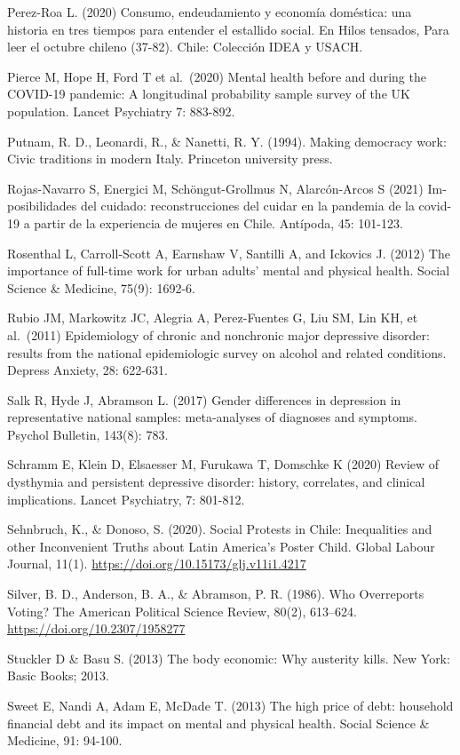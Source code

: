 \documentclass[
  12pt,
]{book}
\begin{document}
Perez-Roa L. (2020) Consumo, endeudamiento y economía doméstica: una historia en tres tiempos para entender el estallido social. En Hilos tensados, Para leer el octubre chileno (37-82). Chile: Colección IDEA y USACH.

Pierce M, Hope H, Ford T et al.~(2020) Mental health before and during the COVID-19 pandemic: A longitudinal probability sample survey of the UK population. Lancet Psychiatry 7: 883-892.

Putnam, R. D., Leonardi, R., \& Nanetti, R. Y. (1994). Making democracy work: Civic traditions in modern Italy. Princeton university press.

Rojas-Navarro S, Energici M, Schöngut-Grollmus N, Alarcón-Arcos S (2021) Im-posibilidades del cuidado: reconstrucciones del cuidar en la pandemia de la covid-19 a partir de la experiencia de mujeres en Chile. Antípoda, 45: 101-123.

Rosenthal L, Carroll-Scott A, Earnshaw V, Santilli A, and Ickovics J. (2012) The importance of full-time work for urban adults' mental and physical health. Social Science \& Medicine, 75(9): 1692-6.

Rubio JM, Markowitz JC, Alegria A, Perez-Fuentes G, Liu SM, Lin KH, et al.~(2011) Epidemiology of chronic and nonchronic major depressive disorder: results from the national epidemiologic survey on alcohol and related conditions. Depress Anxiety, 28: 622-631.

Salk R, Hyde J, Abramson L. (2017) Gender differences in depression in representative national samples: meta-analyses of diagnoses and symptoms. Psychol Bulletin, 143(8): 783.

Schramm E, Klein D, Elsaesser M, Furukawa T, Domschke K (2020) Review of dysthymia and persistent depressive disorder: history, correlates, and clinical implications. Lancet Psychiatry, 7: 801-812.

Sehnbruch, K., \& Donoso, S. (2020). Social Protests in Chile: Inequalities and other Inconvenient Truths about Latin America's Poster Child. Global Labour Journal, 11(1). \url{https://doi.org/10.15173/glj.v11i1.4217}

Silver, B. D., Anderson, B. A., \& Abramson, P. R. (1986). Who Overreports Voting? The American Political Science Review, 80(2), 613--624. \url{https://doi.org/10.2307/1958277}

Stuckler D \& Basu S. (2013) The body economic: Why austerity kills. New York: Basic Books; 2013.

Sweet E, Nandi A, Adam E, McDade T. (2013) The high price of debt: household financial debt and its impact on mental and physical health. Social Science \& Medicine, 91: 94-100.
\end{document}
